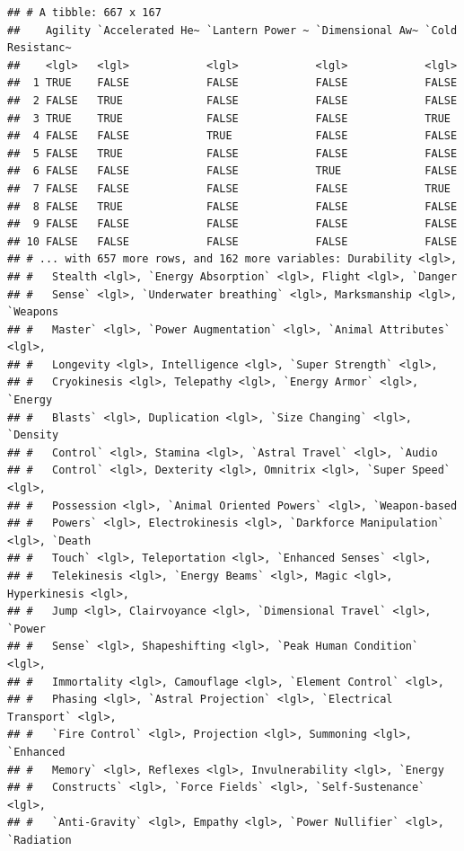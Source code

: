 \documentclass[]{book}
\begin{document}
\begin{verbatim}
## # A tibble: 667 x 167
##    Agility `Accelerated He~ `Lantern Power ~ `Dimensional Aw~ `Cold Resistanc~
##    <lgl>   <lgl>            <lgl>            <lgl>            <lgl>           
##  1 TRUE    FALSE            FALSE            FALSE            FALSE           
##  2 FALSE   TRUE             FALSE            FALSE            FALSE           
##  3 TRUE    TRUE             FALSE            FALSE            TRUE            
##  4 FALSE   FALSE            TRUE             FALSE            FALSE           
##  5 FALSE   TRUE             FALSE            FALSE            FALSE           
##  6 FALSE   FALSE            FALSE            TRUE             FALSE           
##  7 FALSE   FALSE            FALSE            FALSE            TRUE            
##  8 FALSE   TRUE             FALSE            FALSE            FALSE           
##  9 FALSE   FALSE            FALSE            FALSE            FALSE           
## 10 FALSE   FALSE            FALSE            FALSE            FALSE           
## # ... with 657 more rows, and 162 more variables: Durability <lgl>,
## #   Stealth <lgl>, `Energy Absorption` <lgl>, Flight <lgl>, `Danger
## #   Sense` <lgl>, `Underwater breathing` <lgl>, Marksmanship <lgl>, `Weapons
## #   Master` <lgl>, `Power Augmentation` <lgl>, `Animal Attributes` <lgl>,
## #   Longevity <lgl>, Intelligence <lgl>, `Super Strength` <lgl>,
## #   Cryokinesis <lgl>, Telepathy <lgl>, `Energy Armor` <lgl>, `Energy
## #   Blasts` <lgl>, Duplication <lgl>, `Size Changing` <lgl>, `Density
## #   Control` <lgl>, Stamina <lgl>, `Astral Travel` <lgl>, `Audio
## #   Control` <lgl>, Dexterity <lgl>, Omnitrix <lgl>, `Super Speed` <lgl>,
## #   Possession <lgl>, `Animal Oriented Powers` <lgl>, `Weapon-based
## #   Powers` <lgl>, Electrokinesis <lgl>, `Darkforce Manipulation` <lgl>, `Death
## #   Touch` <lgl>, Teleportation <lgl>, `Enhanced Senses` <lgl>,
## #   Telekinesis <lgl>, `Energy Beams` <lgl>, Magic <lgl>, Hyperkinesis <lgl>,
## #   Jump <lgl>, Clairvoyance <lgl>, `Dimensional Travel` <lgl>, `Power
## #   Sense` <lgl>, Shapeshifting <lgl>, `Peak Human Condition` <lgl>,
## #   Immortality <lgl>, Camouflage <lgl>, `Element Control` <lgl>,
## #   Phasing <lgl>, `Astral Projection` <lgl>, `Electrical Transport` <lgl>,
## #   `Fire Control` <lgl>, Projection <lgl>, Summoning <lgl>, `Enhanced
## #   Memory` <lgl>, Reflexes <lgl>, Invulnerability <lgl>, `Energy
## #   Constructs` <lgl>, `Force Fields` <lgl>, `Self-Sustenance` <lgl>,
## #   `Anti-Gravity` <lgl>, Empathy <lgl>, `Power Nullifier` <lgl>, `Radiation

\end{verbatim}
\end{document}

